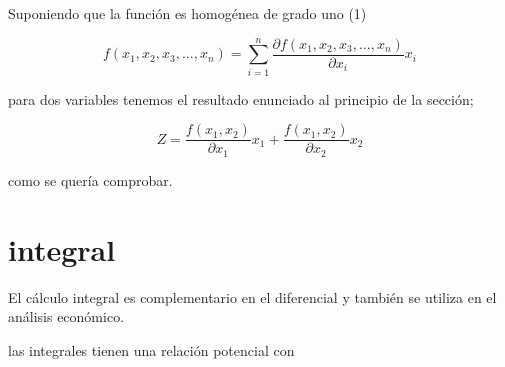 \documentclass[12pt]{article}
\begin{document}
Suponiendo que la función es homogénea de grado uno (1) 


$$f(x_1,x_2,x_3,...,x_n)= \sum_{i=1}^{n}  \dfrac{\partial f(x_1,x_2,x_3,...,x_n)}{\partial x_{i}}x_{i}   $$


para dos variables tenemos el resultado enunciado al principio de la sección; 

$$Z = \dfrac{f(x_{1},x_{2})}{\partial x_{1}}x_{1} + \dfrac{f(x_{1},x_{2})}{\partial x_{2}}x_{2}$$

como se quería comprobar.



\section{integral}

El cálculo integral es complementario en el diferencial y también se utiliza en el análisis económico.


las integrales tienen una relación potencial con 
\end{document}
